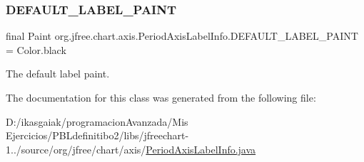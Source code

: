 \subsubsection{\texorpdfstring{D\+E\+F\+A\+U\+L\+T\+\_\+\+L\+A\+B\+E\+L\+\_\+\+P\+A\+I\+NT}{DEFAULT\_LABEL\_PAINT}}
{\footnotesize\ttfamily final Paint org.\+jfree.\+chart.\+axis.\+Period\+Axis\+Label\+Info.\+D\+E\+F\+A\+U\+L\+T\+\_\+\+L\+A\+B\+E\+L\+\_\+\+P\+A\+I\+NT = Color.\+black\hspace{0.3cm}{\ttfamily [static]}}

The default label paint. 

The documentation for this class was generated from the following file\+:\begin{DoxyCompactItemize}
\item 
D\+:/ikasgaiak/programacion\+Avanzada/\+Mis Ejercicios/\+P\+B\+Ldefinitibo2/libs/jfreechart-\/1../source/org/jfree/chart/axis/\mbox{\hyperlink{_period_axis_label_info_8java}{Period\+Axis\+Label\+Info.\+java}}\end{DoxyCompactItemize}
